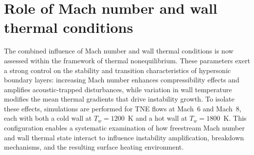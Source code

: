 

\section{Role of Mach number and wall thermal conditions}
The combined influence of Mach number and wall thermal conditions is now assessed within the framework of thermal nonequilibrium. These parameters exert a strong control on the stability and transition characteristics of hypersonic boundary layers: increasing Mach number enhances compressibility effects and amplifies acoustic-trapped disturbances, while variation in wall temperature modifies the mean thermal gradients that drive instability growth. To isolate these effects, simulations are performed for \gls{TNE} flows at Mach~6 and Mach~8, each with both a cold wall at $T_w=1200$~K and a hot wall at $T_w=1800$~K. This configuration enables a systematic examination of how freestream Mach number and wall thermal state interact to influence instability amplification, breakdown mechanisms, and the resulting surface heating environment.



